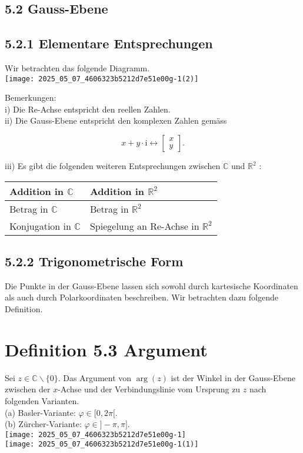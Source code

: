 \documentclass[10pt]{article}
\begin{document}
\subsection*{5.2 Gauss-Ebene}
\subsection*{5.2.1 Elementare Entsprechungen}
Wir betrachten das folgende Diagramm.\\
\texttt{[image: 2025\_05\_07\_4606323b5212d7e51e00g-1(2)]}

Bemerkungen:\\
i) Die Re-Achse entspricht den reellen Zahlen.\\
ii) Die Gauss-Ebene entspricht den komplexen Zahlen gemäss

\[
x+y \cdot \mathrm{i} \longleftrightarrow\left[\begin{array}{l}
x  \tag{5.15}\\
y
\end{array}\right] .
\]

iii) Es gibt die folgenden weiteren Entsprechungen zwischen $\mathbb{C}$ und $\mathbb{R}^{2}$ :

\begin{center}
\begin{tabular}{|l|l|}
\hline
Addition in $\mathbb{C}$ & Addition in $\mathbb{R}^{2}$ \\
\hline
Betrag in $\mathbb{C}$ & Betrag in $\mathbb{R}^{2}$ \\
\hline
Konjugation in $\mathbb{C}$ & Spiegelung an Re-Achse in $\mathbb{R}^{2}$ \\
\hline
\end{tabular}
\end{center}

\subsection*{5.2.2 Trigonometrische Form}
Die Punkte in der Gauss-Ebene lassen sich sowohl durch kartesische Koordinaten als auch durch Polarkoordinaten beschreiben. Wir betrachten dazu folgende Definition.

\section*{Definition 5.3 Argument}
Sei $z \in \mathbb{C} \backslash\{0\}$. Das Argument von $\arg (z)$ ist der Winkel in der Gauss-Ebene zwischen der $x$-Achse und der Verbindungslinie vom Ursprung zu $z$ nach folgenden Varianten.\\
(a) Basler-Variante: $\varphi \in[0,2 \pi[$.\\
(b) Zürcher-Variante: $\varphi \in]-\pi, \pi]$.\\
\texttt{[image: 2025\_05\_07\_4606323b5212d7e51e00g-1]}\\
\texttt{[image: 2025\_05\_07\_4606323b5212d7e51e00g-1(1)]}
\end{document}
